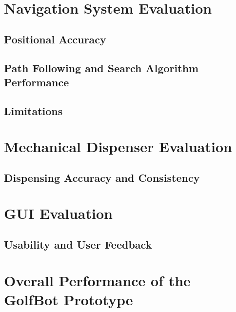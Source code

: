 

\section{Navigation System Evaluation}
\subsection{Positional Accuracy}
\subsection{Path Following and Search Algorithm Performance}
\subsection{Limitations}

\section{Mechanical Dispenser Evaluation}
\subsection{Dispensing Accuracy and Consistency}

\section{GUI Evaluation}
\subsection{Usability and User Feedback}

\section{Overall Performance of the GolfBot Prototype}
